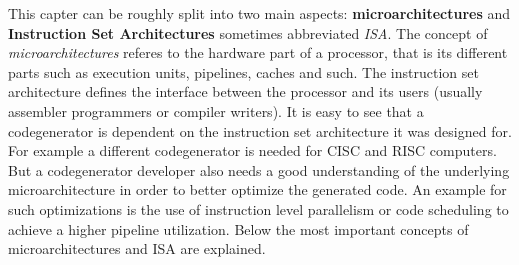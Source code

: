 \documentclass[a4paper,10pt]{article}
\begin{document}
This capter can be roughly split into two main aspects: \textbf{microarchitectures} and \textbf{Instruction Set Architectures} sometimes abbreviated \emph{ISA}. The concept of \textit{microarchitectures} referes to the hardware part
of a processor, that is its different parts such as execution units, pipelines, caches and such. The instruction set architecture defines
the interface between the processor and its users (usually assembler programmers or compiler writers). It is easy to see that a
codegenerator is dependent on the instruction set architecture it was designed for. For example a different codegenerator is needed for
CISC and RISC computers. But a codegenerator developer also needs a good understanding of the underlying microarchitecture in order to
better optimize the generated code. An example for such optimizations is the use of instruction level parallelism or code scheduling to
achieve a higher pipeline utilization. Below the most important concepts of microarchitectures and ISA are explained.
\end{document}
